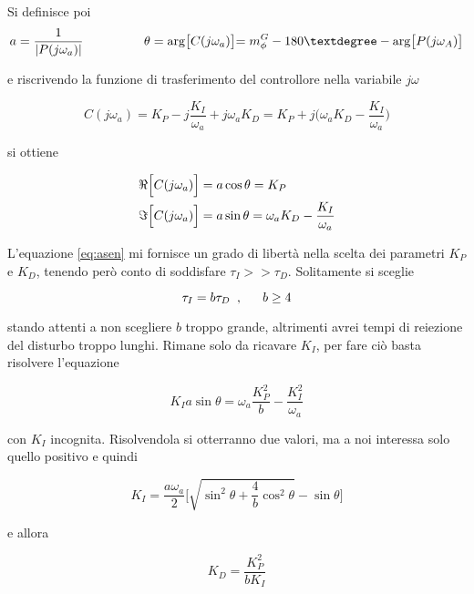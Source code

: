 		\noindent Si definisce poi 
		\begin{equation}
			a=\frac{1}{|P(j\omega_a)|} \trippleSpacing \trippleSpacing \trippleSpacing \theta=\arg\bigl[C(j\omega_a)\bigl]=m_{\phi}^G-180°-\arg\bigl[P(j\omega_A)\bigl]
		\end{equation}
	
		\noindent e riscrivendo la funzione di trasferimento del controllore nella variabile $j\omega$
		
		\begin{equation}
			C(j\omega_a)=K_P-j\frac{K_I}{\omega_a}+j\omega_aK_D=K_P+j\bigl(\omega_aK_D-\frac{K_I}{\omega_a}\bigl)
		\end{equation}
		
		\noindent si ottiene
		
		\begin{align}
			\Re\Bigl[C(j\omega_a)\Bigl] &= a\cos\theta=K_P \\
			\Im\Bigl[C(j\omega_a)\Bigl] &= a\sin\theta=\omega_aK_D-\frac{K_I}{\omega_a}
			\label{eq:asen}
		\end{align}
	
		\noindent L'equazione \ref{eq:asen} mi fornisce un grado di libertà nella scelta dei parametri $K_P$ e $K_D$, tenendo però conto di soddisfare $\tau_I>>\tau_D$. Solitamente si sceglie 
		
		\begin{equation}
			\tau_I=b\tau_D \singleSpacing, \trippleSpacing b\ge4
		\end{equation}
	
		\noindent stando attenti a non scegliere $b$ troppo grande, altrimenti avrei tempi di reiezione del disturbo troppo lunghi. Rimane solo da ricavare $K_I$, per fare ciò basta risolvere l'equazione
		
		\begin{equation}
			K_Ia\sin\theta=\omega_a\frac{K_P^2}{b}-\frac{K_I^2}{\omega_a}
		\end{equation}
	
		\noindent con $K_I$ incognita. Risolvendola si otterranno due valori, ma a noi interessa solo quello positivo e quindi
		
		\begin{equation}
			K_I=\frac{a\omega_a}{2}\Biggl[\sqrt{\sin^2\theta+\frac{4}{b}\cos^2\theta}-\sin\theta\Biggl]
		\end{equation}
		
		\noindent e allora
		
		\begin{equation}
			K_D=\frac{K_P^2}{bK_I}
		\end{equation}
		
